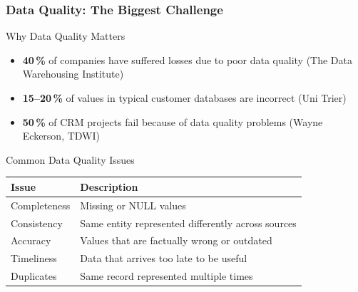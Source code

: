 \begin{frame}
  \frametitle{Data Quality: The Biggest Challenge}

  \begin{block}{Why Data Quality Matters}
    \begin{itemize}
      \item \textbf{40\,\%} of companies have suffered losses due to poor data quality
        \hfill\small(The Data Warehousing Institute)
      \item \textbf{15--20\,\%} of values in typical customer databases are incorrect
        \hfill\small(Uni Trier)
      \item \textbf{50\,\%} of CRM projects fail because of data quality problems
        \hfill\small(Wayne Eckerson, TDWI)
    \end{itemize}
  \end{block}

  \begin{block}{Common Data Quality Issues}
    \begin{tabularx}{\linewidth}{@{}l X@{}}
      \toprule
      \textbf{Issue}       & \textbf{Description} \\
      \midrule
      Completeness         & Missing or NULL values \\
      Consistency          & Same entity represented differently across sources \\
      Accuracy             & Values that are factually wrong or outdated \\
      Timeliness           & Data that arrives too late to be useful \\
      Duplicates           & Same record represented multiple times \\
      \bottomrule
    \end{tabularx}
  \end{block}
\end{frame}

